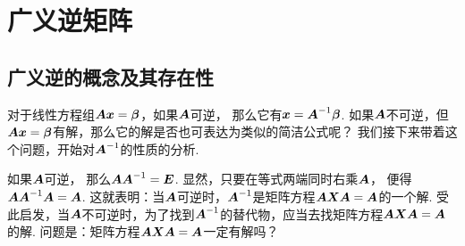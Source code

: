 \section{广义逆矩阵}
\subsection{广义逆的概念及其存在性}
对于线性方程组\(\vb{A} \vb{x} = \vb\beta\)，如果\(\vb{A}\)可逆，
那么它有\(\vb{x} = \vb{A}^{-1} \vb\beta\).
如果\(\vb{A}\)不可逆，但\(\vb{A} \vb{x} = \vb\beta\)有解，那么它的解是否也可表达为类似的简洁公式呢？
我们接下来带着这个问题，开始对\(\vb{A}^{-1}\)的性质的分析.

如果\(\vb{A}\)可逆，
那么\(\vb{A} \vb{A}^{-1} = \vb{E}\).
显然，只要在等式两端同时右乘\(\vb{A}\)，
便得\(\vb{A} \vb{A}^{-1} \vb{A} = \vb{A}\).
这就表明：当\(\vb{A}\)可逆时，\(\vb{A}^{-1}\)是矩阵方程\(\vb{A} \vb{X} \vb{A} = \vb{A}\)的一个解.
受此启发，当\(\vb{A}\)不可逆时，为了找到\(\vb{A}^{-1}\)的替代物，应当去找矩阵方程\(\vb{A} \vb{X} \vb{A} = \vb{A}\)的解.
问题是：矩阵方程\(\vb{A} \vb{X} \vb{A} = \vb{A}\)一定有解吗？

